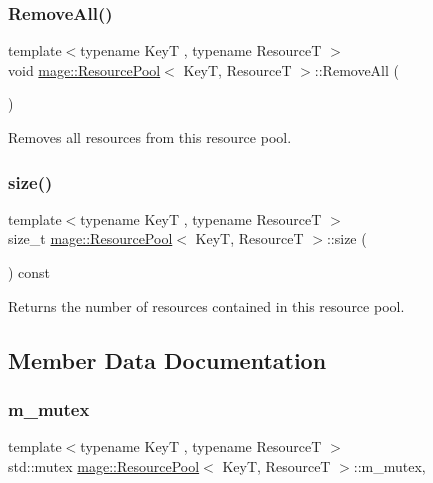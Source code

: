 \subsubsection{\texorpdfstring{Remove\+All()}{RemoveAll()}}
{\footnotesize\ttfamily template$<$typename KeyT , typename ResourceT $>$ \\
void \hyperlink{classmage_1_1_resource_pool}{mage\+::\+Resource\+Pool}$<$ KeyT, ResourceT $>$\+::Remove\+All (\begin{DoxyParamCaption}{ }\end{DoxyParamCaption})}

Removes all resources from this resource pool. \hypertarget{classmage_1_1_resource_pool_ab032684a1ed5a782a61f663e269a994a}{}\label{classmage_1_1_resource_pool_ab032684a1ed5a782a61f663e269a994a} 
\subsubsection{\texorpdfstring{size()}{size()}}
{\footnotesize\ttfamily template$<$typename KeyT , typename ResourceT $>$ \\
size\+\_\+t \hyperlink{classmage_1_1_resource_pool}{mage\+::\+Resource\+Pool}$<$ KeyT, ResourceT $>$\+::size (\begin{DoxyParamCaption}{ }\end{DoxyParamCaption}) const\hspace{0.3cm}{\ttfamily [noexcept]}}

Returns the number of resources contained in this resource pool. 

\subsection{Member Data Documentation}
\hypertarget{classmage_1_1_resource_pool_a3d6d7b0e2e9c3271f8ae3b7c2fa704ba}{}\label{classmage_1_1_resource_pool_a3d6d7b0e2e9c3271f8ae3b7c2fa704ba} 
\subsubsection{\texorpdfstring{m\+\_\+mutex}{m\_mutex}}
{\footnotesize\ttfamily template$<$typename KeyT , typename ResourceT $>$ \\
std\+::mutex \hyperlink{classmage_1_1_resource_pool}{mage\+::\+Resource\+Pool}$<$ KeyT, ResourceT $>$\+::m\+\_\+mutex\hspace{0.3cm}{\ttfamily [mutable]}, {\ttfamily [private]}}

